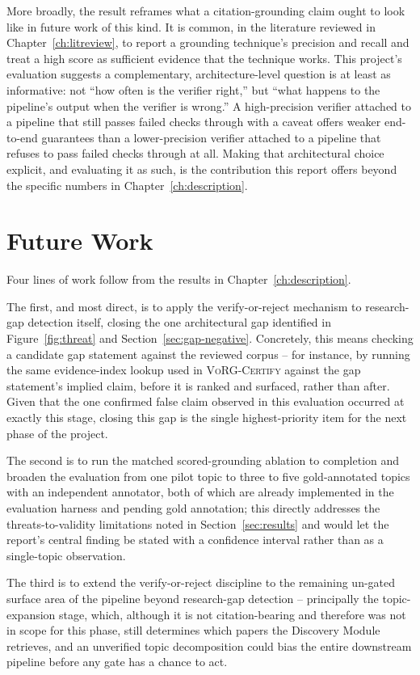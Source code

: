 \documentclass[12pt,a4paper]{report}
\begin{document}
More broadly, the result reframes what a citation-grounding claim ought to
look like in future work of this kind. It is common, in the literature
reviewed in Chapter~\ref{ch:litreview}, to report a grounding technique's
precision and recall and treat a high score as sufficient evidence that the
technique works. This project's evaluation suggests a complementary,
architecture-level question is at least as informative: not ``how often is
the verifier right,'' but ``what happens to the pipeline's output when the
verifier is wrong.'' A high-precision verifier attached to a pipeline that
still passes failed checks through with a caveat offers weaker end-to-end
guarantees than a lower-precision verifier attached to a pipeline that refuses
to pass failed checks through at all. Making that architectural choice
explicit, and evaluating it as such, is the contribution this report offers
beyond the specific numbers in Chapter~\ref{ch:description}.

\section{Future Work}
\label{sec:future-work}
Four lines of work follow from the results in Chapter~\ref{ch:description}.

The first, and most direct, is to apply the verify-or-reject mechanism to
research-gap detection itself, closing the one architectural gap identified
in Figure~\ref{fig:threat} and Section~\ref{sec:gap-negative}. Concretely,
this means checking a candidate gap statement against the reviewed corpus --
for instance, by running the same evidence-index lookup used in
\textsc{VoRG-Certify} against the gap statement's implied claim, before it
is ranked and surfaced, rather than after. Given that the one confirmed false
claim observed in this evaluation occurred at exactly this stage, closing this
gap is the single highest-priority item for the next phase of the project.

The second is to run the matched scored-grounding ablation to completion and
broaden the evaluation from one pilot topic to three to five gold-annotated
topics with an independent annotator, both of which are already implemented
in the evaluation harness and pending gold annotation; this directly addresses
the threats-to-validity limitations noted in
Section~\ref{sec:results} and would let the report's central finding be
stated with a confidence interval rather than as a single-topic observation.

The third is to extend the verify-or-reject discipline to the remaining
un-gated surface area of the pipeline beyond research-gap detection --
principally the topic-expansion stage, which, although it is not
citation-bearing and therefore was not in scope for this phase, still
determines which papers the Discovery Module retrieves, and an unverified
topic decomposition could bias the entire downstream pipeline before any gate
has a chance to act.
\end{document}
